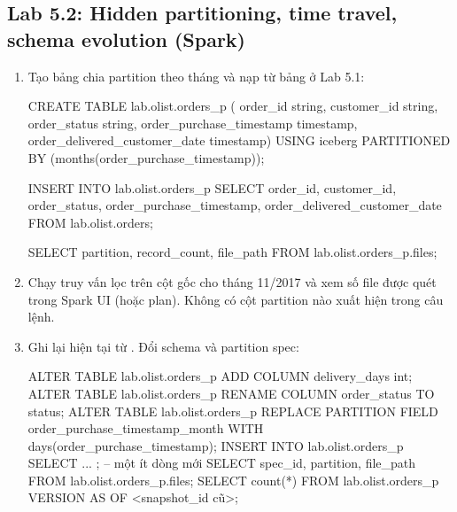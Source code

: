 \subsection{Lab 5.2: Hidden partitioning, time travel, schema evolution (Spark)}
\begin{enumerate}
  \item Tạo bảng chia partition theo tháng và nạp từ bảng ở Lab 5.1:
\begin{codeblock}
CREATE TABLE lab.olist.orders_p (
  order_id string, customer_id string, order_status string,
  order_purchase_timestamp timestamp, order_delivered_customer_date timestamp)
USING iceberg PARTITIONED BY (months(order_purchase_timestamp));

INSERT INTO lab.olist.orders_p
SELECT order_id, customer_id, order_status, order_purchase_timestamp,
       order_delivered_customer_date FROM lab.olist.orders;

SELECT partition, record_count, file_path FROM lab.olist.orders_p.files;
\end{codeblock}
  \item Chạy truy vấn lọc trên cột gốc  cho tháng 11/2017 và xem số file được quét trong Spark UI (hoặc plan). Không có cột partition nào xuất hiện trong câu lệnh.
  \item Ghi lại  hiện tại từ . Đổi schema và partition spec:
\begin{codeblock}
ALTER TABLE lab.olist.orders_p ADD COLUMN delivery_days int;
ALTER TABLE lab.olist.orders_p RENAME COLUMN order_status TO status;
ALTER TABLE lab.olist.orders_p
  REPLACE PARTITION FIELD order_purchase_timestamp_month WITH days(order_purchase_timestamp);
INSERT INTO lab.olist.orders_p SELECT ... ;   -- một ít dòng mới
SELECT spec_id, partition, file_path FROM lab.olist.orders_p.files;
SELECT count(*) FROM lab.olist.orders_p VERSION AS OF <snapshot_id cũ>;
\end{codeblock}
\end{enumerate}

